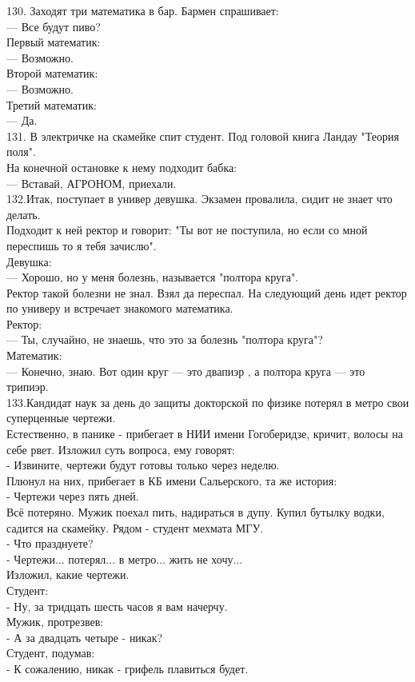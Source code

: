 \documentclass[a4paper,20pt,notitlepage]{extbook}
\begin{document}
	130.     Заходят три математика в бар. Бармен спрашивает:\\
	— Все будут пиво?\\
	Первый математик:\\
	— Возможно.\\
	Второй математик:\\
	— Возможно.\\
	Третий математик:\\
	— Да.\\
	
	131. В электричке на скамейке спит студент. Под головой книга Ландау "Теория поля". \\
	На конечной остановке к нему подходит бабка:\\
	— Вставай, АГРОНОМ, приехали.\\
	
	132.Итак, поступает в универ девушка. Экзамен провалила, сидит не знает что делать.\\
	Подходит к ней ректор и говорит: "Ты вот не поступила, но если со мной переспишь то я тебя зачислю".\\
	Девушка:\\
	— Хорошо, но у меня болезнь, называется "полтора круга".\\
	Ректор такой болезни не знал. Взял да переспал. На следующий день идет ректор по универу и встречает знакомого математика.\\
	Ректор:\\
	— Ты, случайно, не знаешь, что это за болезнь "полтора круга"?\\
	Математик:\\
	— Конечно, знаю. Вот один круг — это двапиэр , а полтора круга — это трипиэр.\\
	

	133.Кандидат наук за день до защиты докторской по физике потерял в метро свои суперценные чертежи.\\ Естественно, в панике - прибегает в НИИ имени Гогоберидзе, кричит, волосы на себе рвет. Изложил суть вопроса, ему говорят:\\
	- Извините, чертежи будут готовы только через неделю.\\
	Плюнул на них, прибегает в КБ имени Сальерского, та же история:\\
	- Чертежи через пять дней.\\
	Всё потеряно. Мужик поехал пить, надираться в дупу. Купил бутылку водки, садится на скамейку. Рядом - студент мехмата МГУ.\\
	- Что празднуете?\\
	- Чертежи... потерял... в метро... жить не хочу...\\
	Изложил, какие чертежи.\\
	Студент:\\
	- Ну, за тридцать шесть часов я вам начерчу.\\
	Мужик, протрезвев:\\
	- А за двадцать четыре - никак?\\
	Студент, подумав:\\
	- К сожалению, никак - грифель плавиться будет.\\
	
\end{document}
